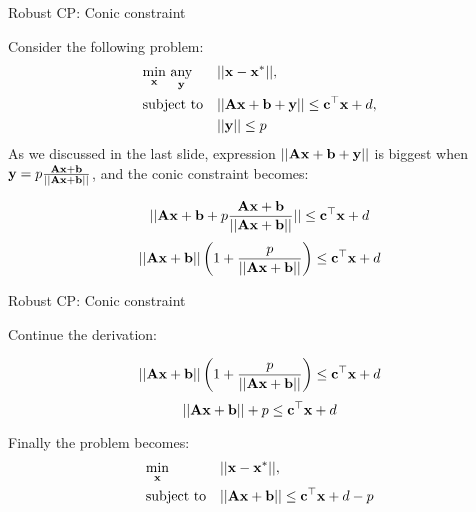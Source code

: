 \documentclass{beamer}
\begin{document}
\begin{frame}{Robust CP: Conic constraint}
	\begin{flushleft}
		
		Consider the following problem:
		\begin{equation}
			\begin{aligned}
				& \underset{\bo{x}}{\text{min}} \ \underset{\bo{y}}{\text{any}}
				& & ||\bo{x} - \bo{x}^*||, \\
				& \text{subject to}
				& & || \bo{A}\bo{x} + \bo{b} + \bo{y} || \leq \bo{c}^\top \bo{x} + d, \\
				& & & ||\bo{y}|| \leq p
			\end{aligned}
		\end{equation}
		As we discussed in the last slide, expression $|| \mathbf{A}\mathbf{x} + \mathbf{b} + \mathbf{y} ||$ is biggest when $\mathbf{y} = p \frac{\mathbf{A}\mathbf{x} + \mathbf{b}}{|| \mathbf{A}\mathbf{x} + \mathbf{b} ||}$, and the conic constraint becomes:
		
		\begin{equation}
			|| \mathbf{A}\mathbf{x} + \mathbf{b} + p \frac{\mathbf{A}\mathbf{x} + \mathbf{b}}{|| \mathbf{A}\mathbf{x} + \mathbf{b} ||} || \leq \mathbf{c}^\top \mathbf{x} + d
		\end{equation}
		\begin{equation}
		|| \mathbf{A}\mathbf{x} + \mathbf{b}|| \left( 1 + \frac{p}{|| \mathbf{A}\mathbf{x} + \mathbf{b}||} \right) \leq \mathbf{c}^\top \mathbf{x} + d
		\end{equation}
		
		
	\end{flushleft}
\end{frame}




\begin{frame}{Robust CP: Conic constraint}
	\begin{flushleft}
		
		Continue the derivation:
		
		\begin{equation}
			|| \mathbf{A}\mathbf{x} + \mathbf{b}|| \left( 1 + \frac{p}{|| \mathbf{A}\mathbf{x} + \mathbf{b}||} \right) \leq \mathbf{c}^\top \mathbf{x} + d
		\end{equation}
		\begin{equation}
			|| \mathbf{A}\mathbf{x} + \mathbf{b}|| + p \leq \mathbf{c}^\top \mathbf{x} + d
		\end{equation}
		
		Finally the problem becomes:
		\begin{equation}
			\begin{aligned}
				& \underset{\mathbf{x}}{\text{min}}
				& & ||\mathbf{x} - \mathbf{x}^*||, \\
				& \text{subject to}
				& & || \mathbf{A}\mathbf{x} + \mathbf{b}|| \leq \mathbf{c}^\top \mathbf{x} + d - p
			\end{aligned}
		\end{equation}
		
	\end{flushleft}
\end{frame}


\myqrframe
\end{document}
